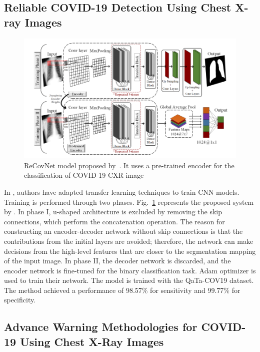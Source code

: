 \subsection{Reliable COVID-19 Detection Using Chest X-ray Images}
\begin{figure}
    \begin{center}
        \includegraphics[width=\textwidth]{Figures/RltDag.png}
        \caption{\label{rlt:dag} ReCovNet model proposed by~\cite{dag}. It uses a pre-trained encoder for the classification of COVID-19 CXR image}
    \end{center}
\end{figure}
In \cite{dag}, authors have adapted transfer learning techniques to train CNN models. Training is performed through two phases. Fig.~\ref{rlt:dag} represents the proposed system by \cite{dag}. In phase I, u-shaped architecture is excluded by removing the skip connections, which perform the concatenation operation. The reason for constructing an encoder-decoder network without skip connections is that the contributions from the initial layers are avoided; therefore, the network can make decisions from the high-level features that are closer to the segmentation mapping of the input image.  In phase II, the decoder network is discarded, and the encoder network is fine-tuned for the binary classification task. Adam optimizer is used to train their network. The model is trained with the QaTa-COV19 dataset. The method achieved a performance of 98.57\% for sensitivity and 99.77\%  for specificity.

\subsection{Advance Warning Methodologies for
COVID-19 Using Chest X-Ray Images}

